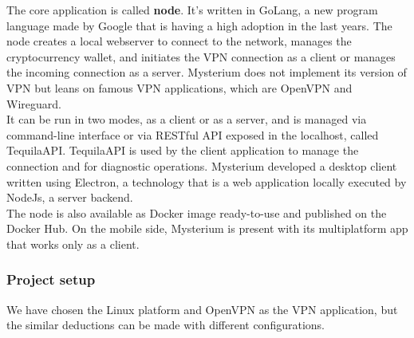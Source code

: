 \documentclass[]{article}
\begin{document}
	The core application is called \textbf{node}. It's written in GoLang, a new program language made by Google that is having a high adoption in the last years. The node creates a local webserver to connect to the network, manages the cryptocurrency wallet, and initiates the VPN connection as a client or manages the incoming connection as a server. Mysterium does not implement its version of VPN but leans on famous VPN applications, which are OpenVPN and Wireguard.\\
	It can be run in two modes, as a client or as a server, and is managed via command-line interface or via RESTful API exposed in the localhost, called TequilaAPI. TequilaAPI is used by the client application to manage the connection and for diagnostic operations. Mysterium developed a desktop client written using Electron, a technology that is a web application locally executed by NodeJs, a server backend.\\
	The node is also available as Docker image ready-to-use and published on the Docker Hub. 
	On the mobile side, Mysterium is present with its multiplatform app that works only as a client.\\

	\subsubsection{Project setup}

	We have chosen the Linux platform and OpenVPN as the VPN application, but the similar deductions can be made with different configurations.
\end{document}
